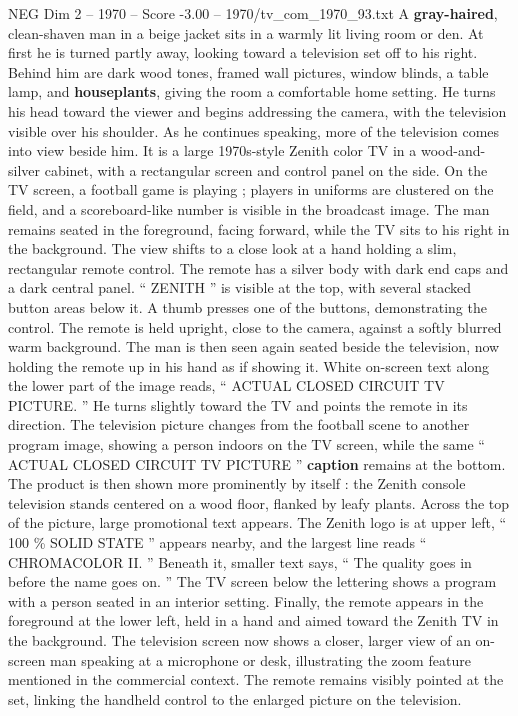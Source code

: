 \begin{textsample}{NEG Dim 2 – 1970 – Score -3.00 – 1970/tv\_com\_1970\_93.txt}  \label{ex:f2_neg_021}
A \textbf{gray-haired}, clean-shaven man in a beige jacket sits in a warmly lit living room or den.
At first he is turned partly away, looking toward a television set off to his right.
Behind him are dark wood tones, framed wall pictures, window blinds, a table lamp, and \textbf{houseplants}, giving the room a comfortable home setting.
He turns his head toward the viewer and begins addressing the camera, with the television visible over his shoulder.
As he continues speaking, more of the television comes into view beside him.
It is a large 1970s-style Zenith color TV in a wood-and-silver cabinet, with a rectangular screen and control panel on the side.
On the TV screen, a football game is playing ; players in uniforms are clustered on the field, and a scoreboard-like number is visible in the broadcast image.
The man remains seated in the foreground, facing forward, while the TV sits to his right in the background.
The view shifts to a close look at a hand holding a slim, rectangular remote control.
The remote has a silver body with dark end caps and a dark central panel. “ ZENITH ” is visible at the top, with several stacked button areas below it.
A thumb presses one of the buttons, demonstrating the control.
The remote is held upright, close to the camera, against a softly blurred warm background.
The man is then seen again seated beside the television, now holding the remote up in his hand as if showing it.
White on-screen text along the lower part of the image reads, “ ACTUAL CLOSED CIRCUIT TV PICTURE. ” He turns slightly toward the TV and points the remote in its direction.
The television picture changes from the football scene to another program image, showing a person indoors on the TV screen, while the same “ ACTUAL CLOSED CIRCUIT TV PICTURE ” \textbf{caption} remains at the bottom.
The product is then shown more prominently by itself : the Zenith console television stands centered on a wood floor, flanked by leafy plants.
Across the top of the picture, large promotional text appears.
The Zenith logo is at upper left, “ 100 \% SOLID STATE ” appears nearby, and the largest line reads “ CHROMACOLOR II. ” Beneath it, smaller text says, “ The quality goes in before the name goes on. ” The TV screen below the lettering shows a program with a person seated in an interior setting.
Finally, the remote appears in the foreground at the lower left, held in a hand and aimed toward the Zenith TV in the background.
The television screen now shows a closer, larger view of an on-screen man speaking at a microphone or desk, illustrating the zoom feature mentioned in the commercial context.
The remote remains visibly pointed at the set, linking the handheld control to the enlarged picture on the television.

\end{textsample}
